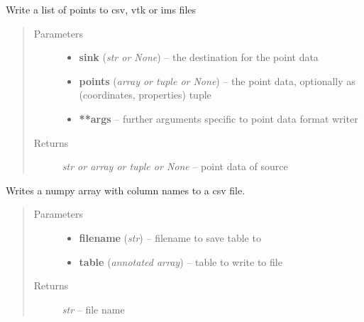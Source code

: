\documentclass[letterpaper,10pt,english]{sphinxmanual}
\begin{document}
\begin{fulllineitems}
\label{api/ClearMap.IO:ClearMap.IO.IO.writePoints}
Write a list of points to csv, vtk or ims files
\begin{quote}\begin{description}
\item[{Parameters}] \leavevmode\begin{itemize}
\item {} 
\textbf{sink} (\emph{str or None}) --
the destination for the point data

\item {} 
\textbf{points} (\emph{array or tuple or None}) --
the point data, optionally as (coordinates, properties) tuple

\item {} 
\textbf{**args} --
further arguments specific to point data format writer

\end{itemize}

\item[{Returns}] \leavevmode
\emph{str or array or tuple or None} --
point data of source

\end{description}\end{quote}




{\hyperref[api/ClearMap.IO:ClearMap.IO.IO.readPoints]{\emph{}}}



\end{fulllineitems}


\begin{fulllineitems}
\label{api/ClearMap.IO:ClearMap.IO.IO.writeTable}
Writes a numpy array with column names to a csv file.
\begin{quote}\begin{description}
\item[{Parameters}] \leavevmode\begin{itemize}
\item {} 
\textbf{filename} (\emph{str}) --
filename to save table to

\item {} 
\textbf{table} (\emph{annotated array}) --
table to write to file

\end{itemize}

\item[{Returns}] \leavevmode
\emph{str} --
file name

\end{description}\end{quote}

\end{fulllineitems}
\end{document}
